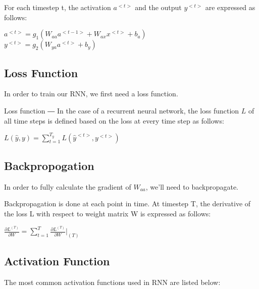 \documentclass[10pt, oneside]{article}   	%
\begin{document}
 \FloatBarrier
 
 For each timestep t, the activation $a^{<t>}$ and the output $y^{<t>}$ are expressed as follows:\
 
 \begin{center}
 
 $a^{<t>} = g_1(W_{aa}a^{<t-1>} + W_{ax}x^{<t>} + b_a)$ \\ $y^{<t>} = g_2(W_{ya}a^{<t>}+b_y)$
 
 \end{center}

\subsection{Loss Function}

In order to train our RNN, we first need a loss function.

Loss function ― In the case of a recurrent neural network, the loss function $L$ of all time steps is defined based on the loss at every time step as follows:

\begin{center}

$L(\hat{y}, y) = \sum^{T_y}_{t=1} L(\hat{y}^{<t>}, y^{<t>})$

\end{center}

\subsection{Backpropogation}

In order to fully calculate the gradient of  $W_{aa}$, we’ll need to backpropagate.

Backpropagation is done at each point in time. At timestep T, the derivative of the loss L with respect to weight matrix  W is expressed as follows:

\begin{center}

$\frac{\partial L^{(T)}}{\partial W} = \sum^T_{t=1} \frac{\partial L^{(T)}}{\partial W} \bigg\vert_{(T)}$

\end{center}

\subsection{Activation Function}

The most common activation functions used in RNN are listed below:\ 
\end{document}

